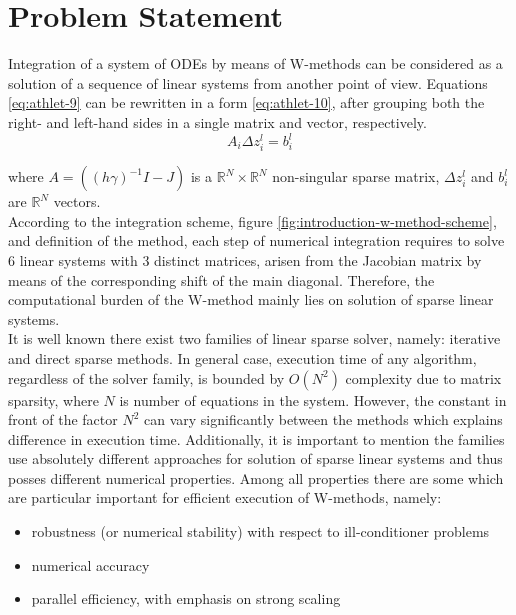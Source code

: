 \chapter{Problem Statement}\label{chapter:problem-statment}


Integration of a system of ODEs by means of W-methods can be considered as a solution of a sequence of linear systems from another point of view. Equations \ref{eq:athlet-9} can be rewritten in a form \ref{eq:athlet-10}, after grouping both the right- and left-hand sides in a single matrix and vector, respectively.\\


\begin{equation} \label{eq:athlet-10}
	A_{i} \Delta z^{l}_{i} =  b^{l}_{i} 
\end{equation}

where $A = ((h \gamma)^{-1}I - J)$ is a $\mathbb{R}^{N} \times \mathbb{R}^{N}$ non-singular sparse matrix, $\Delta z^{l}_{i}$  and $b^{l}_{i}$ are $\mathbb{R}^{N}$ vectors.\\


According to the integration scheme, figure \ref{fig:introduction-w-method-scheme}, and definition of the method, each step of numerical integration requires to solve 6 linear systems with 3 distinct matrices, arisen from the Jacobian matrix by means of the corresponding shift of the main diagonal. Therefore, the computational burden of the W-method mainly lies on solution of sparse linear systems.\\


It is well known there exist two families of linear sparse solver, namely: iterative and direct sparse methods. In general case, execution time of any algorithm, regardless of the solver family, is bounded by $O(N^2)$ complexity due to matrix sparsity, where $N$ is number of equations in the system. However, the constant in front of the factor $N^2$ can vary significantly between the methods which explains difference in execution time. Additionally, it is important to mention the families use absolutely different approaches for solution of sparse linear systems and thus posses different numerical properties. Among all properties there are some which are particular important for efficient execution of W-methods, namely: \\


\begin{itemize}
	\item robustness (or numerical stability) with respect to ill-conditioner problems
	\item numerical accuracy
	\item parallel efficiency, with emphasis on strong scaling 
\end{itemize}


